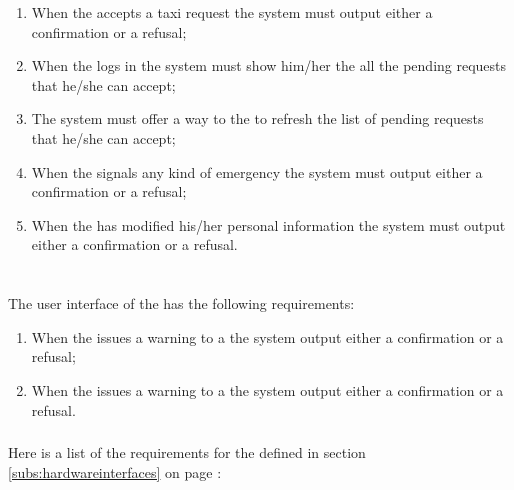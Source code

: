 \begin{enumerate} [resume*]

\item When the \emph{} accepts a taxi request the system must output either a confirmation or a refusal;

\item When the \emph{} logs in the system must show him/her the all the pending requests that he/she can accept;

\item The system must offer a way to the \emph{} to refresh the list of pending requests that he/she can accept;

\item When the \emph{} signals any kind of emergency the system must output either a confirmation or a refusal;

\item When the \emph{} has modified his/her personal information the system must output either a confirmation or a refusal.

\end{enumerate}

\paragraph{} \hfill \\
The user interface of the  has the following requirements:

\begin{enumerate} [resume*]

\item When the \emph{} issues a warning to a \emph{} the system output either a confirmation or a refusal;

\item When the \emph{} issues a warning to a \emph{} the system output either a confirmation or a refusal.

\end{enumerate}


\subsubsection{} %
Here is a list of the requirements for the  defined in section \ref{subs:hardwareinterfaces} on page \pageref{subs:hardwareinterfaces}:

